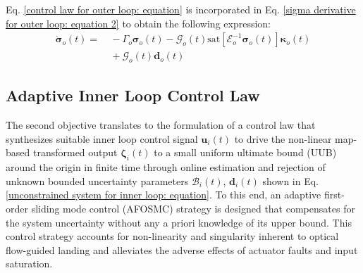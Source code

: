 \documentclass[lettersize,journal]{IEEEtran}
\begin{document}
Eq. \eqref{control law for outer loop: equation} is incorporated in Eq. \eqref{sigma derivative for outer loop: equation 2} to obtain the following expression:
\begin{align}
    \label{sigma derivative for outer loop: equation 3}
    \dot{\boldsymbol{\sigma}}_o(t) =&~ - \Gamma_o \boldsymbol{\sigma}_o(t) - \mathcal{G}_o(t) \text{sat}[ \mathcal{E}_o^{-1}\boldsymbol{\sigma}_o(t)] \boldsymbol{\kappa}_o(t) \nonumber \\ 
    & ~ + \mathcal{G}_o(t) \boldsymbol{d}_o(t)
\end{align}

\subsection{Adaptive Inner Loop Control Law} \label{adaptive controller for inner loop : section}
The second objective translates to the formulation of a control law that synthesizes suitable inner loop control signal $\boldsymbol{u}_i(t)$ to drive the non-linear map-based transformed output $\boldsymbol{\zeta}_i(t)$ to a small uniform ultimate bound (UUB) around the origin in finite time through online estimation and rejection of unknown bounded uncertainty parameters $\mathcal{B}_i(t)$, $\boldsymbol{d}_i(t)$ shown in Eq. \eqref{unconstrained system for inner loop: equation}.
To this end, an adaptive first-order sliding mode control (AFOSMC) strategy is designed that compensates for the system uncertainty without any a priori knowledge of its upper bound.
This control strategy accounts for non-linearity and singularity inherent to optical flow-guided landing and alleviates the adverse effects of actuator faults and input saturation.
\end{document}
